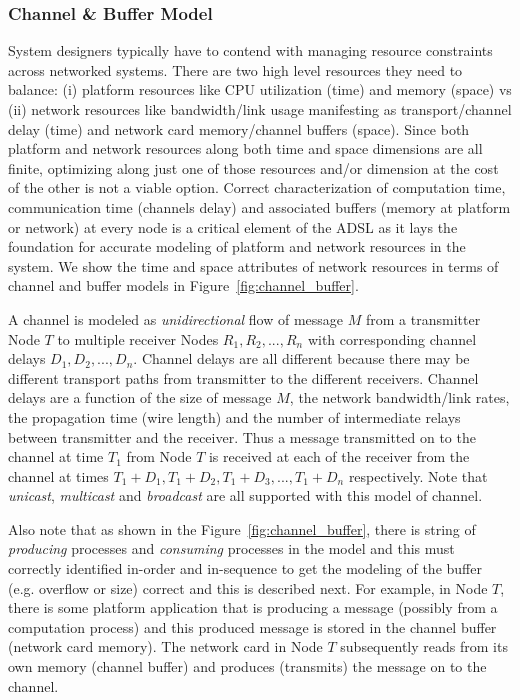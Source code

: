 \subsubsection{Channel \& Buffer Model}
\label{subsubsec:channel_buffer_model}


System designers typically have to contend with managing resource constraints across networked systems. There are two high level resources they need to balance: (i) platform resources like CPU utilization (time) and memory (space) vs (ii) network resources like bandwidth/link usage manifesting as transport/channel delay (time) and network card memory/channel buffers (space). Since both platform and network resources along both time and space dimensions are all finite, optimizing along just one of those resources and/or dimension at the cost of the other is not a viable option. Correct characterization of computation time, communication time (channels delay) and associated buffers (memory at platform or network) at every node is a critical element of the ADSL as it lays the foundation for accurate modeling of platform and network resources in the system.  We show the time and space attributes of network resources in terms of channel and buffer models in Figure~\ref{fig:channel_buffer}. 

A channel is modeled as \emph{unidirectional} flow of message $M$ from a transmitter Node $T$ to multiple receiver Nodes $R_1,R_2,...,R_n$ with corresponding channel delays $D_1,D_2,...,D_n$. Channel delays are all different because there may be different transport paths from transmitter to the different receivers. Channel delays are a function of the size of message $M$, the network bandwidth/link rates, the propagation time (wire length) and the number of intermediate relays between transmitter and the receiver. Thus a message transmitted on to the channel at time $T_1$ from Node $T$ is received at each of the receiver from the channel at times $T_1+D_1, T_1+D_2, T_1+D_3,...,T_1+D_n$ respectively. Note that \emph{unicast}, \emph{multicast} and \emph{broadcast} are all supported with this model of channel.

Also note that as shown in the Figure~\ref{fig:channel_buffer}, there is string of \emph{producing} processes and \emph{consuming} processes in the model and this must correctly identified in-order and in-sequence to get the modeling of the buffer (e.g. overflow or size) correct and this is described next. For example, in Node $T$, there is some platform application that is producing a message (possibly from a computation process) and this produced message is stored in the channel buffer (network card memory). The network card in Node $T$ subsequently reads from its own memory (channel buffer) and produces (transmits) the message on to the channel. 

